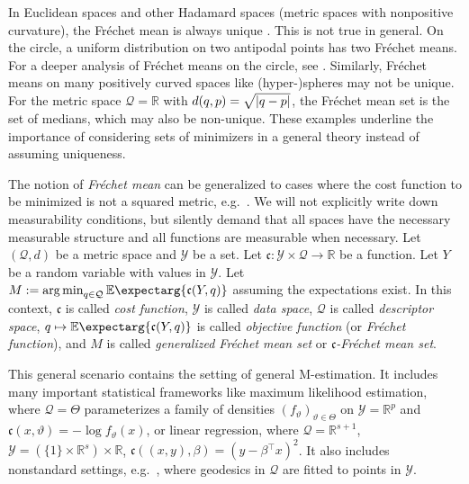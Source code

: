 \documentclass{scrartcl}
\newcommand{\Ex}{\E\expectarg}
\newcommand*{\mc}[1]{\mathcal{#1}}
\newcommand*{\mf}[1]{\mathfrak{#1}}
\newcommand{\R}{\mathbb{R}}
\newcommand{\transpose}{\!^\top\!}
\newcommand{\tr}{\transpose}
\DeclareMathOperator*{\argmin}{arg\,min}
\theoremstyle{plain}\newtheorem{theorem}{Theorem}[section]
\theoremstyle{definition}
\theoremstyle{remark}
\begin{document}
In Euclidean spaces and other Hadamard spaces (metric spaces with nonpositive curvature), the Fréchet mean is always unique \cite[Proposition 4.3]{sturm03}. This is not true in general. On the circle, a uniform distribution on two antipodal points has two Fréchet means. For a deeper analysis of Fréchet means on the circle, see \cite{hotz15}. Similarly, Fréchet means on many positively curved spaces like (hyper-)spheres may not be unique. For the metric space $\mc Q = \R$ with $d(q,p) =\sqrt{\left| q-p \right|}$, the Fréchet mean set is the set of medians, which may also be non-unique. These examples underline the importance of considering sets of minimizers in a general theory instead of assuming uniqueness.

The notion of \textit{Fréchet mean} can be generalized to cases where the cost function to be minimized is not a squared metric, e.g.\ \cite{huckemann11}. We will not explicitly write down measurability conditions, but silently demand that all spaces have the necessary measurable structure and all functions are measurable when necessary. Let $(\mc Q, d)$ be a metric space and $\mc Y$ be a set. Let $\mf c \colon \mc Y \times \mc Q \to \R$ be a function. Let $Y$ be a random variable with values in $\mc Y$. Let $M := \argmin_{q\in\mc Q} \Ex{\mf c(Y, q)}$ assuming the expectations exist. 
In this context, $\mf c$ is called \textit{cost function}, $\mc Y$ is called \textit{data space}, $\mc Q$ is called \textit{descriptor space}, $q\mapsto\Ex{\mf c(Y, q)}$ is called \textit{objective function} (or \textit{Fréchet function}), and $M$ is called \textit{generalized Fréchet mean set} or \textit{$\mf c$-Fréchet mean set}. 

This general scenario contains the setting of general M-estimation. It includes many important statistical frameworks like maximum likelihood estimation, where $\mc Q = \Theta$ parameterizes a family of densities $(f_\vartheta)_{\vartheta\in\Theta}$ on $\mc Y = \R^p$ and $\mf c(x,\vartheta) = -\log f_{\vartheta}(x)$, or linear regression, where $\mc Q = \R^{s+1}$, $\mc Y = (\{1\}\times\R^s) \times \R$, $\mf c((x,y),\beta) = (y - \beta\tr x)^2$. It also includes nonstandard settings, e.g.\ \cite{huckemann11}, where geodesics in $\mc Q$ are fitted to points in $\mc Y$.
\end{document}
